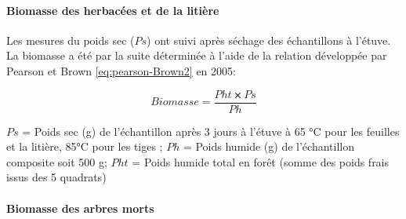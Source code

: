 \documentclass[
  12pt,
  a4paper,
  extrafontsizes,
  onecolumn,
  openright]{book}
\theoremstyle{definition}
\theoremstyle{definition}
\theoremstyle{definition}
\theoremstyle{definition}
\theoremstyle{remark}
\begin{document}
\begin{table}
\centering
\caption{\label{tab:Biomasse-especesarborescentes2}Equations allométriques de quelques espèces végétales arborescentes.}
\centering
{}
\end{table}

\hypertarget{biomasse-des-herbacuxe9es-et-de-la-litiuxe8re}{%
\paragraph{Biomasse des herbacées et de la litière}\label{biomasse-des-herbacuxe9es-et-de-la-litiuxe8re}}

Les mesures du poids sec (\(Ps\)) ont suivi après séchage des échantillons à l'étuve. La biomasse a été par la suite déterminée à l'aide de la relation développée par Pearson et Brown \eqref{eq:pearson-Brown2} en 2005:

\begin{equation}
Biomasse=\frac{Pht⨯Ps}{Ph}
\label{eq:pearson-Brown2}
\end{equation}

\(Ps\) = Poids sec (g) de l'échantillon après 3 jours à l'étuve à 65 °C pour les feuilles et la litière, 85°C pour les tiges ;
\(Ph\) = Poids humide (g) de l'échantillon composite soit 500 g;
\(Pht\) = Poids humide total en forêt (somme des poids frais issus des 5 quadrats)

\hypertarget{biomasse-des-arbres-morts}{%
\paragraph{Biomasse des arbres morts}\label{biomasse-des-arbres-morts}}
\end{document}
